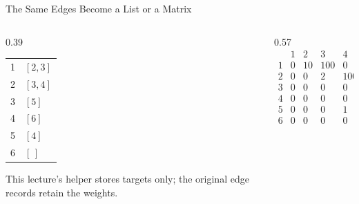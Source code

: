 \documentclass[aspectratio=169,11pt]{beamer}
\begin{document}
\begin{frame}{The Same Edges Become a List or a Matrix}
  \begin{columns}[T,onlytextwidth]
    \begin{column}{0.39\textwidth}
      {\large\textbf{}}
      \vspace{0.6em}

      \begin{tabular}{c@{\ $\longrightarrow$\ }l}
        1 & $[2,3]$\\
        2 & $[3,4]$\\
        3 & $[5]$\\
        4 & $[6]$\\
        5 & $[4]$\\
        6 & $[\,]$\\
      \end{tabular}

      \vspace{0.8em}
      This lecture's helper stores targets only; the original edge records retain the weights.
    \end{column}
    \begin{column}{0.57\textwidth}
      {\large\textbf{}}
      \vspace{0.4em}
      \[
      \begin{array}{c|rrrrrr}
          &1&2&3&4&5&6\\\hline
        1&0&10&100&0&0&0\\
        2&0&0&2&100&0&0\\
        3&0&0&0&0&6&0\\
        4&0&0&0&0&0&1\\
        5&0&0&0&1&0&0\\
        6&0&0&0&0&0&0
      \end{array}
      \]
    \end{column}
  \end{columns}
\end{frame}
\end{document}
